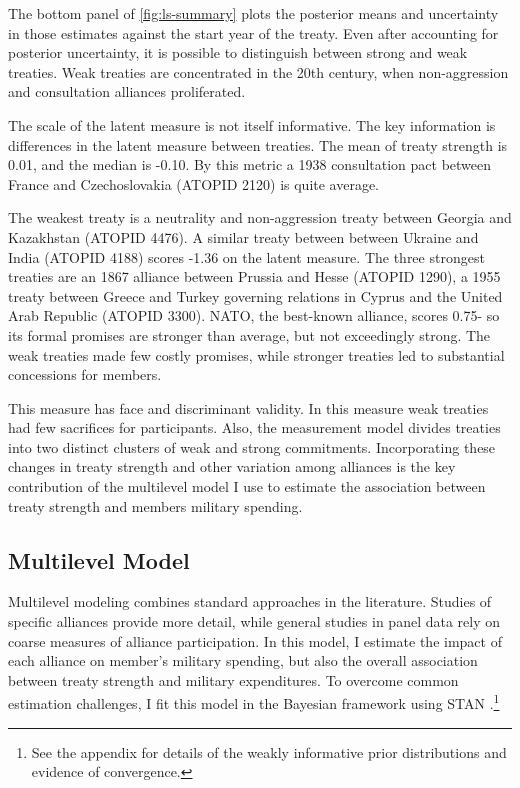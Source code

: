 \documentclass[12pt]{article}
\begin{document}
	
The bottom panel of \autoref{fig:ls-summary} plots the posterior means and uncertainty in those estimates against the start year of the treaty. 
Even after accounting for posterior uncertainty, it is possible to distinguish between strong and weak treaties. 
Weak treaties are concentrated in the 20th century, when non-aggression and consultation alliances proliferated. 


The scale of the latent measure is not itself informative. 
The key information is differences in the latent measure between treaties. 
The mean of treaty strength is 0.01, and the median is -0.10. 
By this metric a 1938 consultation pact between France and Czechoslovakia (ATOPID 2120) is quite average. 


The weakest treaty is a neutrality and non-aggression treaty between Georgia and Kazakhstan (ATOPID 4476).  
A similar treaty between between Ukraine and India (ATOPID 4188) scores -1.36 on the latent measure.
The three strongest treaties are an 1867 alliance between Prussia and Hesse (ATOPID 1290), a 1955 treaty between Greece and Turkey governing relations in Cyprus and the United Arab Republic (ATOPID 3300).  
NATO, the best-known alliance, scores 0.75- so its formal promises are stronger than average, but not exceedingly strong. 
The weak treaties made few costly promises, while stronger treaties led to substantial concessions for members. 


This measure has face and discriminant validity. 
In this measure weak treaties had few sacrifices for participants. 
Also, the measurement model divides treaties into two distinct clusters of weak and strong commitments. 
Incorporating these changes in treaty strength and other variation among alliances is the key contribution of the multilevel model I use to estimate the association between treaty strength and members military spending.  


\subsection{Multilevel Model} 


Multilevel modeling combines standard approaches in the literature. 
Studies of specific alliances provide more detail, while general studies in panel data rely on coarse measures of alliance participation.
In this model, I estimate the impact of each alliance on member's military spending, but also the overall association between treaty strength and military expenditures. 
To overcome common estimation challenges, I fit this model in the Bayesian framework using STAN \citep{Carpenteretal2016}.\footnote{See the appendix for details of the weakly informative prior distributions and evidence of convergence.}
\end{document}
